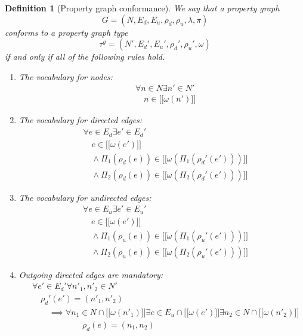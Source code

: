 \documentclass[a4paper]{article}
\newtheorem{definition}[theorem]{Definition}
\newcommand{\gtype}{\tau^g}
\newcommand{\lsem}{\ensuremath{[\![}}
\newcommand{\rsem}{\ensuremath{]\!]}}
\newcommand{\sem}[1]{\ensuremath{\lsem #1 \rsem}}
\begin{document}
\begin{definition}[Property graph conformance]
  We say that a property graph \[G = (N, E_d, E_u, \rho_d, \rho_u, \lambda, \pi)\] \emph{conforms} to a property graph type \[\gtype = (N', E_d', E_u', \rho_d', \rho_u', \omega)\] if and only if all of the following rules hold.

  \begin{enumerate}
    \item The vocabulary for nodes:
    \begin{align*}
      &\forall n \in N \exists n' \in N'\\
      &\quad n \in \sem{\omega(n')}
    \end{align*}
    
    \item The vocabulary for directed edges:
    \begin{align*}
      &\forall e \in E_d \exists e' \in E_d'\\
      &\quad e \in \sem{\omega(e')}\\
      &\quad\wedge \Pi_1(\rho_d(e)) \in \sem{\omega(\Pi_1(\rho_d'(e')))}\\
      &\quad\wedge \Pi_2(\rho_d(e)) \in \sem{\omega(\Pi_2(\rho_d'(e')))}
    \end{align*}

    \item The vocabulary for undirected edges:
    \begin{align*}
      &\forall e \in E_u \exists e' \in E_u'\\
      &\quad e \in \sem{\omega(e')}\\
      &\quad\wedge \Pi_1(\rho_u(e)) \in \sem{\omega(\Pi_1(\rho_u'(e')))}\\
      &\quad\wedge \Pi_2(\rho_u(e)) \in \sem{\omega(\Pi_2(\rho_u'(e')))}
    \end{align*}
    
    \item Outgoing directed edges are mandatory:
    \begin{align*}
      &\forall e' \in E_d' \forall n'_1, n'_2 \in N'\\
      &\quad\rho_d'(e') = (n'_1, n'_2)\\
      &\quad\quad\implies {} \forall n_1 \in N \cap \sem{\omega(n'_1)} \exists e \in E_u \cap \sem{\omega(e')} \exists n_2 \in N \cap \sem{\omega(n'_2)}\\
      &\quad\quad\quad\quad\quad\quad\rho_d(e) = (n_1, n_2)
    \end{align*}


\end{enumerate}
\end{definition}
\end{document}
